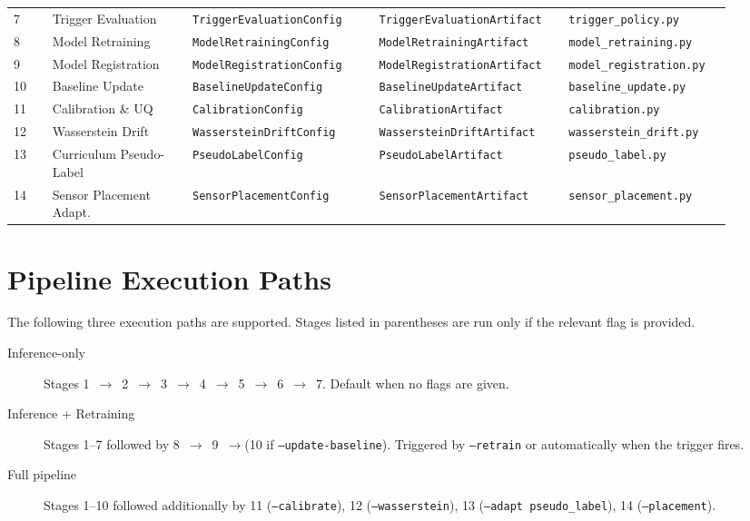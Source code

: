 \begin{longtable}{p{0.05\linewidth}p{0.18\linewidth}p{0.24\linewidth}p{0.24\linewidth}p{0.21\linewidth}}
  7 & Trigger Evaluation
    & \texttt{TriggerEvaluationConfig}
    & \texttt{TriggerEvaluationArtifact}
    & \texttt{trigger\_policy.py} \\[2pt]

  8 & Model Retraining
    & \texttt{ModelRetrainingConfig}
    & \texttt{ModelRetrainingArtifact}
    & \texttt{model\_retraining.py} \\[2pt]

  9 & Model Registration
    & \texttt{ModelRegistrationConfig}
    & \texttt{ModelRegistrationArtifact}
    & \texttt{model\_registration.py} \\[2pt]

  10 & Baseline Update
     & \texttt{BaselineUpdateConfig}
     & \texttt{BaselineUpdateArtifact}
     & \texttt{baseline\_update.py} \\[2pt]

  11 & Calibration \& UQ
     & \texttt{CalibrationConfig}
     & \texttt{CalibrationArtifact}
     & \texttt{calibration.py} \\[2pt]

  12 & Wasserstein Drift
     & \texttt{WassersteinDriftConfig}
     & \texttt{WassersteinDriftArtifact}
     & \texttt{wasserstein\_drift.py} \\[2pt]

  13 & Curriculum Pseudo-Label
     & \texttt{PseudoLabelConfig}
     & \texttt{PseudoLabelArtifact}
     & \texttt{pseudo\_label.py} \\[2pt]

  14 & Sensor Placement Adapt.
     & \texttt{SensorPlacementConfig}
     & \texttt{SensorPlacementArtifact}
     & \texttt{sensor\_placement.py} \\[2pt]
\end{longtable}

\section*{Pipeline Execution Paths}

The following three execution paths are supported.
Stages listed in parentheses are run only if the relevant flag is provided.

\begin{description}
  \item[Inference-only]
    Stages 1~$\to$~2~$\to$~3~$\to$~4~$\to$~5~$\to$~6~$\to$~7.
    Default when no flags are given.
  \item[Inference + Retraining]
    Stages 1--7 followed by 8~$\to$~9~$\to$(10 if \texttt{--update-baseline}).
    Triggered by \texttt{--retrain} or automatically when the trigger fires.
  \item[Full pipeline]
    Stages 1--10 followed additionally by 11 (\texttt{--calibrate}),
    12 (\texttt{--wasserstein}), 13 (\texttt{--adapt pseudo\_label}),
    14 (\texttt{--placement}).
\end{description}
